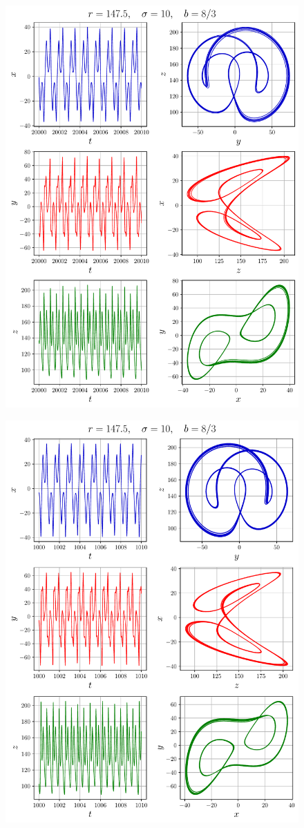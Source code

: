 \documentclass[12pt,a4paper]{article}
\begin{document}
	\begin{figure}[h!]
		\centering
		\includegraphics{fig/10.4.9.single}
	\end{figure}
	\begin{figure}[h!]
		\centering
		\includegraphics{fig/10.4.9.double}
	\end{figure}
	\restoregeometry
\end{document}
